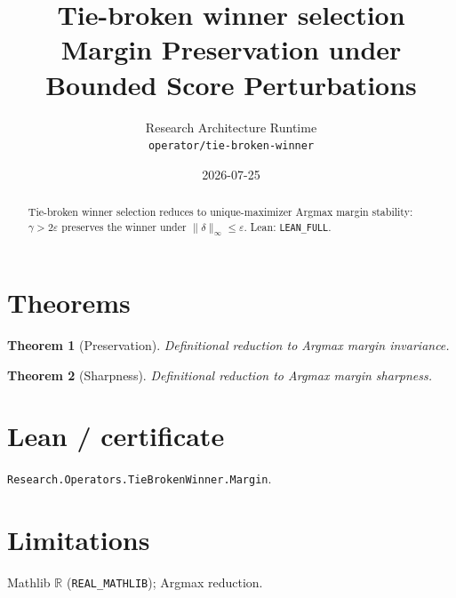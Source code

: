 \documentclass[11pt]{article}
\title{Tie-broken winner selection Margin Preservation under Bounded Score Perturbations}
\author{Research Architecture Runtime \\ \texttt{operator/tie-broken-winner}}
\date{2026-07-25}
\newtheorem{theorem}{Theorem}
\begin{document}
\maketitle
\begin{abstract}
Tie-broken winner selection reduces to unique-maximizer Argmax margin stability: $\gamma>2\varepsilon$
preserves the winner under $\|\delta\|_\infty\le\varepsilon$. Lean: \texttt{LEAN\_FULL}.
\end{abstract}
\section{Theorems}
\begin{theorem}[Preservation]
Definitional reduction to Argmax margin invariance.
\end{theorem}
\begin{theorem}[Sharpness]
Definitional reduction to Argmax margin sharpness.
\end{theorem}
\section{Lean / certificate}
\texttt{Research.Operators.TieBrokenWinner.Margin}.
\section{Limitations}
Mathlib $\mathbb{R}$ (\texttt{REAL\_MATHLIB}); Argmax reduction.
\end{document}
